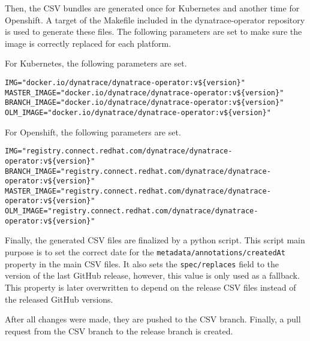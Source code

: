 Then, the CSV bundles are generated once for Kubernetes and another time for Openshift.
A target of the Makefile included in the dynatrace-operator repository is used to generate these files.
The following parameters are set to make sure the image is correctly replaced for each platform.

For Kubernetes, the following parameters are set.

\begin{verbatim}
IMG="docker.io/dynatrace/dynatrace-operator:v${version}"
MASTER_IMAGE="docker.io/dynatrace/dynatrace-operator:v${version}"
BRANCH_IMAGE="docker.io/dynatrace/dynatrace-operator:v${version}"
OLM_IMAGE="docker.io/dynatrace/dynatrace-operator:v${version}"
\end{verbatim}

For Openshift, the following parameters are set.

\begin{verbatim}
IMG="registry.connect.redhat.com/dynatrace/dynatrace-operator:v${version}"
BRANCH_IMAGE="registry.connect.redhat.com/dynatrace/dynatrace-operator:v${version}"
MASTER_IMAGE="registry.connect.redhat.com/dynatrace/dynatrace-operator:v${version}"
OLM_IMAGE="registry.connect.redhat.com/dynatrace/dynatrace-operator:v${version}"
\end{verbatim}

Finally, the generated CSV files are finalized by a python script.
This script main purpose is to set the correct date for the \verb|metadata/annotations/createdAt| property in the main CSV files.
It also sets the \verb|spec/replaces| field to the version of the last GitHub release, however, this value is only used as a fallback.
This property is later overwritten to depend on the release CSV files instead of the released GitHub versions.

After all changes were made, they are pushed to the CSV branch.
Finally, a pull request from the CSV branch to the release branch is created.

